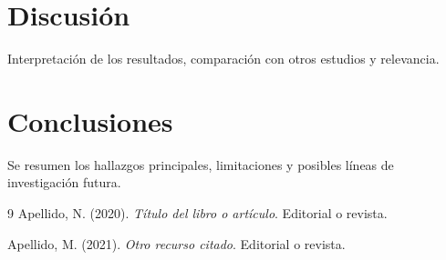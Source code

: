 \documentclass[12pt,a4paper]{article}
\begin{document}
	\section{Discusión}
	Interpretación de los resultados, comparación con otros estudios y relevancia.
	
	\section{Conclusiones}
	Se resumen los hallazgos principales, limitaciones y posibles líneas de investigación futura.
	
	\begin{thebibliography}{9}
		Apellido, N. (2020). \textit{Título del libro o artículo}. Editorial o revista.
		
		Apellido, M. (2021). \textit{Otro recurso citado}. Editorial o revista.
	\end{thebibliography}
	
\end{document}
